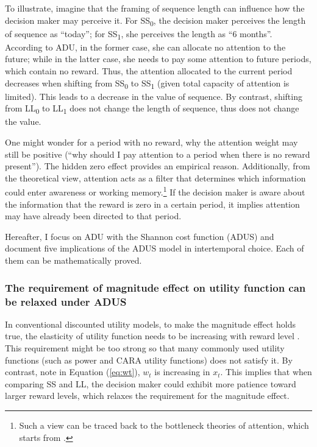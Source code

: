 \documentclass[
  12pt,
]{article}
\begin{document}
To illustrate, imagine that the framing of sequence length can influence
how the decision maker may perceive it. For SS\textsubscript{0}, the
decision maker perceives the length of sequence as ``today''; for
SS\textsubscript{1}, she perceives the length as ``6 months''. According
to ADU, in the former case, she can allocate no attention to the future;
while in the latter case, she needs to pay some attention to future
periods, which contain no reward. Thus, the attention allocated to the
current period decreases when shifting from SS\textsubscript{0} to
SS\textsubscript{1} (given total capacity of attention is limited). This
leads to a decrease in the value of sequence. By contrast, shifting from
LL\textsubscript{0} to LL\textsubscript{1} does not change the length of
sequence, thus does not change the value.

One might wonder for a period with no reward, why the attention weight
may still be positive (``why should I pay attention to a period when
there is no reward present''). The hidden zero effect provides an
empirical reason. Additionally, from the theoretical view, attention
acts as a filter that determines which information could enter awareness
or working memory.\footnote{Such a view can be traced back to the
  bottleneck theories of attention, which starts from
  \citet{broadbent_perception_1958}.} If the decision maker is aware
about the information that the reward is zero in a certain period, it
implies attention may have already been directed to that period.

Hereafter, I focus on ADU with the Shannon cost function (ADUS) and
document five implications of the ADUS model in intertemporal choice.
Each of them can be mathematically proved.

\hypertarget{the-requirement-of-magnitude-effect-on-utility-function-can-be-relaxed-under-adus}{%
\subsubsection{The requirement of magnitude effect on utility function
can be relaxed under
ADUS}\label{the-requirement-of-magnitude-effect-on-utility-function-can-be-relaxed-under-adus}}

In conventional discounted utility models, to make the magnitude effect
holds true, the elasticity of utility function needs to be increasing
with reward level \citep{loewenstein_anomalies_1992}. This requirement
might be too strong so that many commonly used utility functions (such
as power and CARA utility functions) does not satisfy it. By contrast,
note in Equation (\ref{eq:wt}), \(w_t\) is increasing in \(x_t\). This
implies that when comparing SS and LL, the decision maker could exhibit
more patience toward larger reward levels, which relaxes the requirement
for the magnitude effect.
\end{document}
